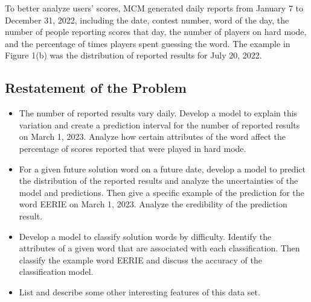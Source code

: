 \documentclass[12pt]{article}
\begin{document}
To better analyze users' scores, MCM generated daily reports from January 7 to December 31, 2022, including the date, contest number, word of the day, the number of people reporting scores that day, the number of players on hard mode, and the percentage of times players spent guessing the word. 
The example in Figure 1(b) was the distribution of reported results for July 20, 2022.




\subsection{Restatement of the Problem}

\begin{itemize}
	\item The number of reported results vary daily. Develop a model to explain this variation and
    create a prediction interval for the number of reported results on March
    1, 2023. Analyze how certain attributes of the word affect the percentage of scores reported that were
    played in hard mode.
    \item For a given future solution word on a future date, develop a model to predict the distribution of the reported results and analyze the uncertainties of the model and predictions.
    Then give a specific example of the prediction for the word
    EERIE on March 1, 2023. Analyze the credibility of the prediction result.
    \item Develop a model to classify solution words by difficulty. Identify the
    attributes of a given word that are associated with each classification. Then classify the example word EERIE and discuss the accuracy of the classification model. 
    \item List and describe some other interesting features of this data set.
\end{itemize}
	
\end{document}
